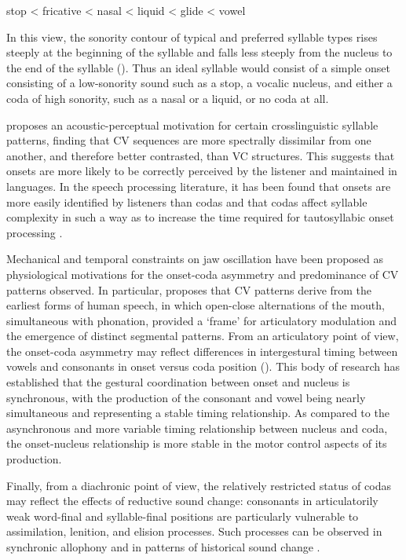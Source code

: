\ea\label{ex:1.6}
  stop < fricative < nasal < liquid < glide < vowel
\z

In this view, the sonority contour of typical and preferred syllable types rises steeply at the beginning of the syllable and falls less steeply from the nucleus to the end of the syllable (\citealt{Zwicky1972,Hooper1976,Greenberg19651978,Clements1990}). Thus an ideal syllable would consist of a simple onset consisting of a low-sonority sound such as a stop, a vocalic nucleus, and either a coda of high sonority, such as a nasal or a liquid, or no coda at all.

  \citet{Kawasaki-Fukumori1992} proposes an acoustic-perceptual motivation for certain crosslinguistic syllable patterns, finding that CV sequences are more spectrally dissimilar from one another, and therefore better contrasted, than VC structures. This suggests that onsets are more likely to be correctly perceived by the listener and maintained in languages. In the speech processing literature, it has been found that onsets are more easily identified by listeners than codas \citep{ContentEtAl2001} and that codas affect syllable complexity in such a way as to increase the time required for tautosyllabic onset processing \citep{SeguiEtAl1991}. 

  Mechanical and temporal constraints on jaw oscillation have been proposed as physiological motivations for the onset-coda asymmetry and predominance of CV patterns observed. In particular, \citet{MacNeilage1998} proposes that CV patterns derive from the earliest forms of human speech, in which open-close alternations of the mouth, simultaneous with phonation, provided a ‘frame’ for articulatory modulation and the emergence of distinct segmental patterns. From an articulatory point of view, the onset-coda asymmetry may reflect differences in intergestural timing between vowels and consonants in onset versus coda position (\citealt{Byrd1996a,BrowmanGoldstein1995,GickEtAl2006,MarinPouplier2010}). This body of research has established that the gestural coordination between onset and nucleus is synchronous, with the production of the consonant and vowel being nearly simultaneous and representing a stable timing relationship. As compared to the asynchronous and more variable timing relationship between nucleus and coda, the onset-nucleus relationship is more stable in the motor control aspects of its production.

  Finally, from a diachronic point of view, the relatively restricted status of codas may reflect the effects of reductive sound change: consonants in articulatorily weak word-final and syllable-final positions are particularly vulnerable to assimilation, lenition, and elision processes. Such processes can be observed in synchronic allophony and in patterns of historical sound change \citep{Bybee2015b}.


